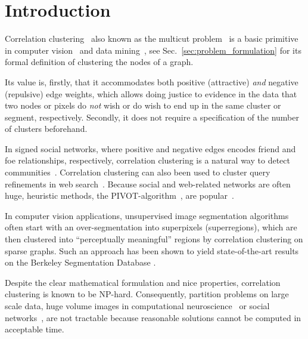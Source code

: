 %
\section{Introduction}
Correlation clustering~\cite{Bansal-2002} also known as the multicut problem~\cite{chopra_1993_mp} 
is a basic primitive in computer vision~\cite{andres_2011_iccv,kroeger_2012_eccv,yarkony_2012_eccv,alush_2013_simbad} and data mining~\cite{Chierichetti-2014,Arasu-2009,Sadikov-2010,Chen-2012},
see Sec.~\ref{sec:problem_formulation} for its formal definition of clustering the nodes of a graph.
 
Its value is, firstly, that it accommodates both positive (attractive) \emph{and} negative (repulsive) edge weights,
which allows doing justice to evidence in the data that two nodes or pixels do \emph{not} wish  or do wish to end up in the same cluster or segment, respectively.
Secondly, it does not require a specification of the number of clusters beforehand.


In signed social networks, where positive and negative edges encodes friend and foe relationships, respectively,
correlation clustering is a natural way to detect communities~\cite{Chierichetti-2014,Chen-2012}.
Correlation clustering can also been used to cluster query refinements in web search~\cite{Sadikov-2010}.
Because social and web-related networks are often huge, heuristic methods, \eg the PIVOT-algorithm~\cite{Ailon-2008},
are popular~\cite{Chierichetti-2014}.

In computer vision applications, unsupervised image segmentation algorithms often start with an over-segmentation
into superpixels (superregions), which are then clustered into ``perceptually meaningful''
regions by correlation clustering on sparse graphs.
Such an approach has been shown to yield
state-of-the-art results on the Berkeley Segmentation Database
\cite{andres_2011_iccv,Kim-2011,yarkony_2012_eccv,alush_2013_simbad}.

Despite the clear mathematical formulation and nice properties,
correlation clustering is known to be NP-hard. 
%
Consequently, partition problems on large scale data, \eg
huge volume images in computational neuroscience~\cite{kroeger_2012_eccv}
or social networks~\cite{Leskovec-2010}, 
are not tractable because reasonable solutions cannot be computed in acceptable time.


